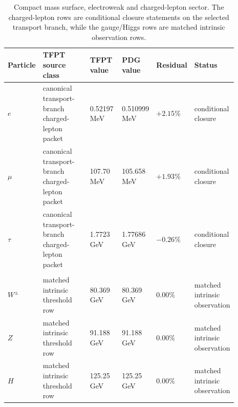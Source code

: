 \documentclass[11pt,a4paper]{article}
\theoremstyle{definition}
\theoremstyle{remark}
\begin{document}
\begin{table}[p]
\centering
\scriptsize
\setlength{\tabcolsep}{3pt}
\begin{tabularx}{\linewidth}{@{}>{\raggedright\arraybackslash}p{0.10\linewidth}>{\raggedright\arraybackslash}p{0.27\linewidth}>{\raggedleft\arraybackslash}p{0.15\linewidth}>{\raggedleft\arraybackslash}p{0.15\linewidth}>{\raggedleft\arraybackslash}p{0.10\linewidth}>{\raggedright\arraybackslash}p{0.12\linewidth}@{}}
\toprule
Particle & TFPT source class & TFPT value & PDG value & Residual & Status \\
\midrule
$e$ & canonical transport-branch charged-lepton packet & \num{0.52197} MeV & \num{0.510999} MeV & $+2.15\%$ & conditional closure \\
$\mu$ & canonical transport-branch charged-lepton packet & \num{107.70} MeV & \num{105.658} MeV & $+1.93\%$ & conditional closure \\
$\tau$ & canonical transport-branch charged-lepton packet & \num{1.7723} GeV & \num{1.77686} GeV & $-0.26\%$ & conditional closure \\
\midrule
\multicolumn{6}{@{}l}{\textit{Matched intrinsic observation surface:}} \\
$W^\pm$ & matched intrinsic threshold row & \num{80.369} GeV & \num{80.369} GeV & $0.00\%$ & matched intrinsic observation \\
$Z$ & matched intrinsic threshold row & \num{91.188} GeV & \num{91.188} GeV & $0.00\%$ & matched intrinsic observation \\
$H$ & matched intrinsic threshold row & \num{125.25} GeV & \num{125.25} GeV & $0.00\%$ & matched intrinsic observation \\
\bottomrule
\end{tabularx}
\caption{Compact mass surface, electroweak and charged-lepton sector. The charged-lepton rows are conditional closure statements on the selected transport branch, while the gauge/Higgs rows are matched intrinsic observation rows.}
\label{tab:sm-mass-ledger-ew}
\end{table}
\end{document}
